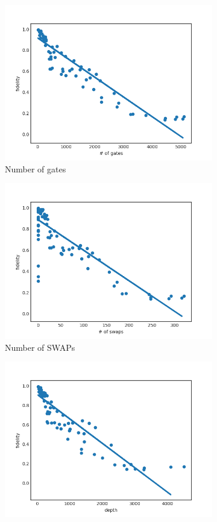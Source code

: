 \documentclass[11pt]{article}
\begin{document}
\begin{figure}[H] 
  \begin{subfigure}[b]{0.5\linewidth}
    \centering
    \includegraphics[width=0.75\linewidth]{f_g_3000_0_005} 
    \caption{Number of gates} 
    \label{fig:f_g_3000} 
    \vspace{4ex}
  \end{subfigure}%
  \begin{subfigure}[b]{0.5\linewidth}
    \centering
    \includegraphics[width=0.75\linewidth]{f_s_3000_0_005} 
    \caption{Number of SWAPs} 
    \label{fig:f_s_3000} 
    \vspace{4ex}
  \end{subfigure} 
  \begin{subfigure}[b]{0.5\linewidth}
    \centering
    \includegraphics[width=0.75\linewidth]{f_d_3000_0_005} 

\end{subfigure}
\end{figure}
\end{document}
